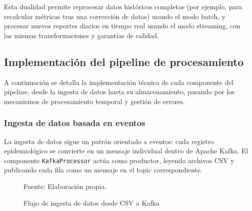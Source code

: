\documentclass[12pt,a4paper]{article}
\renewcommand{\footnotesize}{\fontsize{10pt}{12pt}\selectfont}
\begin{document}
Esta dualidad permite reprocesar datos históricos completos (por ejemplo, para recalcular métricas tras una corrección de datos) usando el modo batch, y procesar nuevos reportes diarios en tiempo real usando el modo streaming, con las mismas transformaciones y garantías de calidad.

\subsection{\texorpdfstring{Implementación del pipeline de procesamiento}{Implementación del pipeline de procesamiento}}\label{implementaciuxf3n-del-pipeline-de-procesamiento}

A continuación se detalla la implementación técnica de cada componente del pipeline, desde la ingesta de datos hasta su almacenamiento, pasando por los mecanismos de procesamiento temporal y gestión de errores.

\subsubsection{Ingesta de datos basada en eventos}\label{ingesta-de-datos-basada-en-eventos}

La ingesta de datos sigue un patrón orientado a eventos: cada registro epidemiológico se convierte en un mensaje individual dentro de Apache Kafka. El componente \texttt{KafkaProcessor} actúa como productor, leyendo archivos CSV y publicando cada fila como un mensaje en el topic correspondiente.

\begin{figure}[H]
    \centering
    \caption{Flujo de ingesta de datos desde CSV a Kafka}
    {\footnotesize Fuente: Elaboración propia.}
\end{figure}
\end{document}

